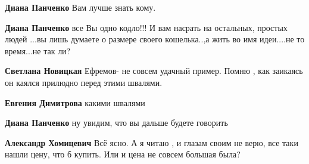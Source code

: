 \begin{itemize}
\begin{itemize}
\textbf{Диана Панченко} Вам лучше знать кому.

 
\textbf{Диана Панченко} все Вы одно кодло!!! И вам насрать на остальных,
простых людей ...вы лишь думаете о размере своего кошелька..,а жить во имя
идеи....не то время...не так ли?

 
\textbf{Светлана Новицкая} Ефремов- не совсем удачный пример. Помню , как заикаясь он каялся прилюдно перед этими швалями.

 
\textbf{Евгения Димитрова} какими швалями

 
\textbf{Диана Панченко} ну увидим, что вы дальше будете говорить

 
\textbf{Александр Хомицевич} Всё ясно. А я читаю , и глазам своим не верю, все таки нашли цену, что б купить. Или и цена не совсем большая была?

 

\end{itemize}
\end{itemize}
